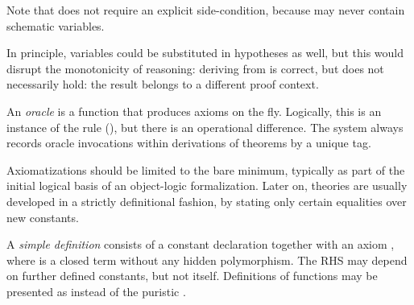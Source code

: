\begin{isabellebody}
\begin{isamarkuptext}
  Note that  does not require an explicit
  side-condition, because  may never contain schematic
  variables.

  In principle, variables could be substituted in hypotheses as well,
  but this would disrupt the monotonicity of reasoning: deriving
   from  is
  correct, but  does not necessarily hold:
  the result belongs to a different proof context.

  \medskip An \emph{oracle} is a function that produces axioms on the
  fly.  Logically, this is an instance of the  rule
  (), but there is an operational difference.
  The system always records oracle invocations within derivations of
  theorems by a unique tag.

  Axiomatizations should be limited to the bare minimum, typically as
  part of the initial logical basis of an object-logic formalization.
  Later on, theories are usually developed in a strictly definitional
  fashion, by stating only certain equalities over new constants.

  A \emph{simple definition} consists of a constant declaration  together with an axiom , where  is a closed term without any hidden polymorphism.  The RHS
  may depend on further defined constants, but not  itself.
  Definitions of functions may be presented as  instead of the puristic .


\end{isamarkuptext}
\end{isabellebody}
